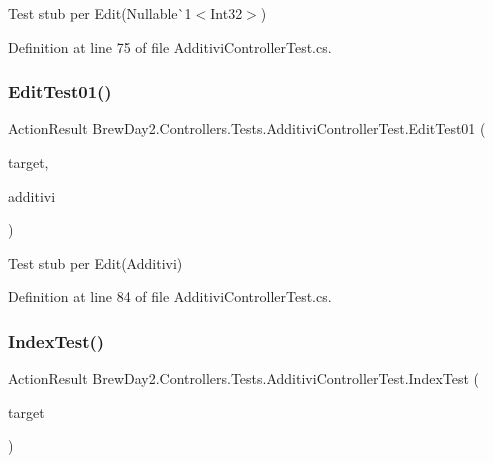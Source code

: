 Test stub per Edit(Nullable\`{}1$<$Int32$>$)



Definition at line 75 of file Additivi\+Controller\+Test.\+cs.

\mbox{\label{class_brew_day2_1_1_controllers_1_1_tests_1_1_additivi_controller_test_a253222d621d9c1bdc018e68110c01330}} 
\subsubsection{\texorpdfstring{Edit\+Test01()}{EditTest01()}}
{\footnotesize\ttfamily Action\+Result Brew\+Day2.\+Controllers.\+Tests.\+Additivi\+Controller\+Test.\+Edit\+Test01 (\begin{DoxyParamCaption}\item[{\mbox{[}\+Pex\+Assume\+Under\+Test\mbox{]} \mbox{\hyperlink{class_brew_day2_1_1_controllers_1_1_additivi_controller}{Additivi\+Controller}}}]{target,  }\item[{\mbox{\hyperlink{class_brew_day2_1_1_models_1_1_additivi}{Additivi}}}]{additivi }\end{DoxyParamCaption})}



Test stub per Edit(\+Additivi)



Definition at line 84 of file Additivi\+Controller\+Test.\+cs.

\mbox{\label{class_brew_day2_1_1_controllers_1_1_tests_1_1_additivi_controller_test_ae1aa64c7fd8fe8ff8c010ce818128a45}} 
\subsubsection{\texorpdfstring{Index\+Test()}{IndexTest()}}
{\footnotesize\ttfamily Action\+Result Brew\+Day2.\+Controllers.\+Tests.\+Additivi\+Controller\+Test.\+Index\+Test (\begin{DoxyParamCaption}\item[{\mbox{[}\+Pex\+Assume\+Under\+Test\mbox{]} \mbox{\hyperlink{class_brew_day2_1_1_controllers_1_1_additivi_controller}{Additivi\+Controller}}}]{target }\end{DoxyParamCaption})}



